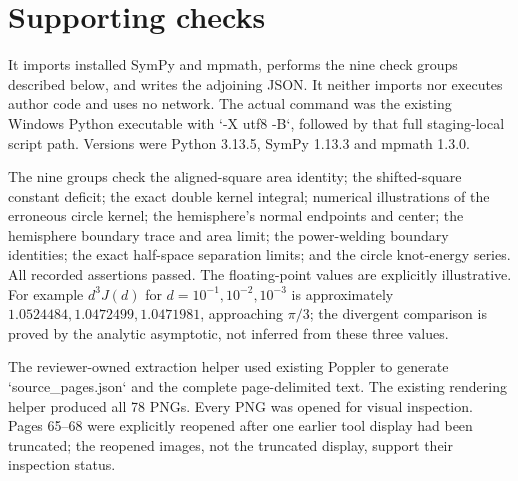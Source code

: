 \documentclass[10pt]{article}
\begin{document}
\section*{Supporting checks}
It imports installed SymPy and mpmath, performs the nine check groups described below, and writes the adjoining JSON. It neither imports nor executes author code and uses no network. The actual command was the existing Windows Python executable with `-X utf8 -B`, followed by that full staging-local script path. Versions were Python 3.13.5, SymPy 1.13.3 and mpmath 1.3.0.\par
The nine groups check the aligned-square area identity; the shifted-square constant deficit; the exact double kernel integral; numerical illustrations of the erroneous circle kernel; the hemisphere’s normal endpoints and center; the hemisphere boundary trace and area limit; the power-welding boundary identities; the exact half-space separation limits; and the circle knot-energy series. All recorded assertions passed. The floating-point values are explicitly illustrative. For example \(d^3J(d)\) for \(d=10^{-1},10^{-2},10^{-3}\) is approximately \(1.0524484,1.0472499,1.0471981\), approaching \(\pi/3\); the divergent comparison is proved by the analytic asymptotic, not inferred from these three values.\par
The reviewer-owned extraction helper used existing Poppler to generate `source\_pages.json` and the complete page-delimited text. The existing rendering helper produced all 78 PNGs. Every PNG was opened for visual inspection. Pages 65–68 were explicitly reopened after one earlier tool display had been truncated; the reopened images, not the truncated display, support their inspection status.\par
\end{document}
